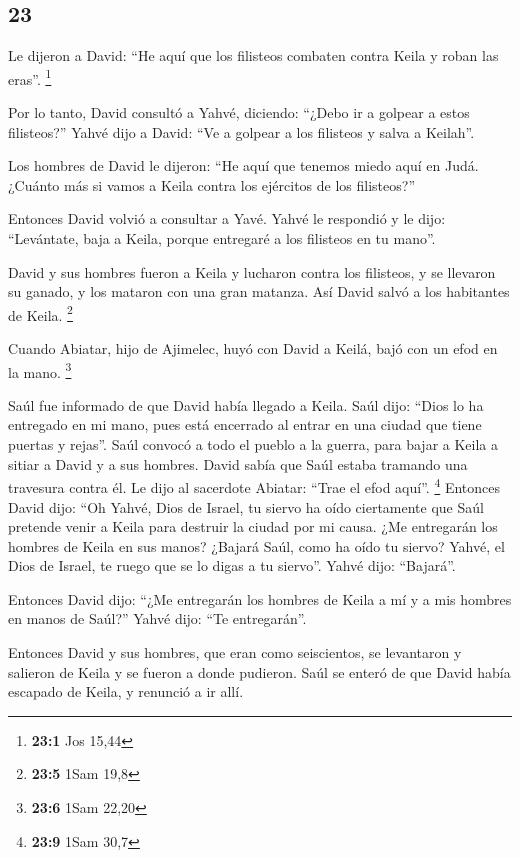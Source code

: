 \begin{paracol}{2}
\hypertarget{section-44}{%
\section{23}\label{section-44}}

 Le dijeron a David: ``He aquí que los filisteos combaten
contra Keila y roban las eras''. \footnote{\textbf{23:1} Jos 15,44}

 Por lo tanto, David consultó a Yahvé, diciendo: ``¿Debo
ir a golpear a estos filisteos?'' Yahvé dijo a David: ``Ve a golpear a
los filisteos y salva a Keilah''.

 Los hombres de David le dijeron: ``He aquí que tenemos
miedo aquí en Judá. ¿Cuánto más si vamos a Keila contra los ejércitos de
los filisteos?''

 Entonces David volvió a consultar a Yavé. Yahvé le
respondió y le dijo: ``Levántate, baja a Keila, porque entregaré a los
filisteos en tu mano''.

 David y sus hombres fueron a Keila y lucharon contra los
filisteos, y se llevaron su ganado, y los mataron con una gran matanza.
Así David salvó a los habitantes de Keila. \footnote{\textbf{23:5} 1Sam
  19,8}

 Cuando Abiatar, hijo de Ajimelec, huyó con David a Keilá,
bajó con un efod en la mano. \footnote{\textbf{23:6} 1Sam 22,20}

 Saúl fue informado de que David había llegado a Keila.
Saúl dijo: ``Dios lo ha entregado en mi mano, pues está encerrado al
entrar en una ciudad que tiene puertas y rejas''.  Saúl
convocó a todo el pueblo a la guerra, para bajar a Keila a sitiar a
David y a sus hombres.  David sabía que Saúl estaba
tramando una travesura contra él. Le dijo al sacerdote Abiatar: ``Trae
el efod aquí''. \footnote{\textbf{23:9} 1Sam 30,7} 
Entonces David dijo: ``Oh Yahvé, Dios de Israel, tu siervo ha oído
ciertamente que Saúl pretende venir a Keila para destruir la ciudad por
mi causa.  ¿Me entregarán los hombres de Keila en sus
manos? ¿Bajará Saúl, como ha oído tu siervo? Yahvé, el Dios de Israel,
te ruego que se lo digas a tu siervo''. Yahvé dijo: ``Bajará''.

 Entonces David dijo: ``¿Me entregarán los hombres de
Keila a mí y a mis hombres en manos de Saúl?'' Yahvé dijo: ``Te
entregarán''.

 Entonces David y sus hombres, que eran como seiscientos,
se levantaron y salieron de Keila y se fueron a donde pudieron. Saúl se
enteró de que David había escapado de Keila, y renunció a ir allí.


\end{paracol}
